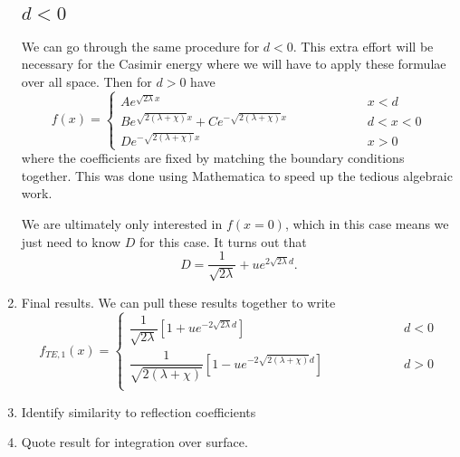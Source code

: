\begin{enumerate}
    \subsection{$d<0$}
    We can go through the same procedure for $d<0$.
    This extra effort will be necessary for the Casimir energy where we will have to apply these formulae over all space.    
    Then for $d>0$ have 
    \begin{equation}
      f(x) =\left\{ 
        \begin{array}{lcr}  A e^{\sqrt{2\lambda} x} & \hspace{2cm} & x<d\\
          B e^{\sqrt{2(\lambda+\chi)}x} + Ce^{-\sqrt{2(\lambda+\chi)}x} & \hspace{2cm} & d<x<0\\
          D e^{-\sqrt{2(\lambda+\chi)}x} & \hspace{2cm} & x>0
        \end{array}
      \right.
    \end{equation}
    where the coefficients are fixed by matching the boundary conditions together.
    This was done using Mathematica to speed up the tedious algebraic work.  

    We are ultimately only interested in $f(x=0)$, which in this case means we just need to know $D$ for this case.
    It turns out that 
    \begin{equation}
      D = \frac{1}{\sqrt{2\lambda}} + u e^{2\sqrt{2\lambda}d}.
    \end{equation}
    \item Final results.
    We can pull these results together to write
    \begin{equation}
      f_{TE,1}(x) = \left\{\begin{array}{lcr} 
          \dfrac{1}{\sqrt{2\lambda}}\left[1+ u e^{-2\sqrt{2\lambda}d}\right]  & \hspace{2cm} & d<0\\
          \dfrac{1}{\sqrt{2(\lambda+\chi)}}\left[1 - u e^{-2\sqrt{2(\lambda+\chi)}d}\right] & \hspace{2cm} & d>0\\
        \end{array} \right. 
    \end{equation}

  \item Identify similarity to reflection coefficients
  \item {Quote result for integration over surface.}


\end{enumerate}
